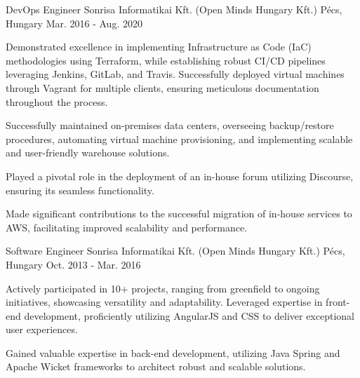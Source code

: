 \begin{cventries}
  \cventry
    {DevOps Engineer} %
    {Sonrisa Informatikai Kft. (Open Minds Hungary Kft.)} %
    {Pécs, Hungary} %
    {Mar. 2016 - Aug. 2020} %
    {
      \begin{cvitems} %
        \item {Demonstrated excellence in implementing Infrastructure as Code (IaC) methodologies using Terraform, while establishing robust CI/CD pipelines leveraging Jenkins, GitLab, and Travis. Successfully deployed virtual machines through Vagrant for multiple clients, ensuring meticulous documentation throughout the process.}
        \item {Successfully maintained on-premises data centers, overseeing backup/restore procedures, automating virtual machine provisioning, and implementing scalable and user-friendly warehouse solutions.}
        \item {Played a pivotal role in the deployment of an in-house forum utilizing Discourse, ensuring its seamless functionality.}
        \item {Made significant contributions to the successful migration of in-house services to AWS, facilitating improved scalability and performance.}
      \end{cvitems}
    }

  \cventry
    {Software Engineer} %
    {Sonrisa Informatikai Kft. (Open Minds Hungary Kft.)} %
    {Pécs, Hungary} %
    {Oct. 2013 - Mar. 2016} %
    {
      \begin{cvitems} %
      \item {Actively participated in 10+ projects, ranging from greenfield to ongoing initiatives, showcasing versatility and adaptability. Leveraged expertise in front-end development, proficiently utilizing AngularJS and CSS to deliver exceptional user experiences.}
        \item {Gained valuable expertise in back-end development, utilizing Java Spring and Apache Wicket frameworks to architect robust and scalable solutions.}
      \end{cvitems}
    }

\end{cventries}
